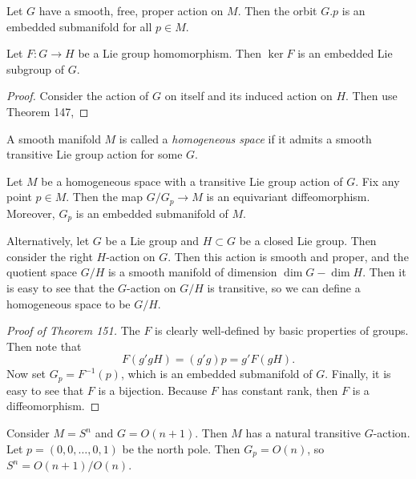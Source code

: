 \documentclass[twoside, 10pt]{article}
\begin{document}
    \begin{cor}
        Let $G$ have a smooth, free, proper action on $M$. Then the orbit $G.p$ is an embedded submanifold for all $p \in M$.
    \end{cor}

    \begin{prop}
        Let $F:G \to H$ be a Lie group homomorphism. Then $\ker F$ is an embedded Lie subgroup of $G$.
    \end{prop}

    \begin{proof}
        Consider the action of $G$ on itself and its induced action on $H$. Then use Theorem 147,
    \end{proof}

    \begin{defn}
        A smooth manifold $M$ is called a \textit{homogeneous space} if it admits a smooth transitive Lie group action for some $G$.
    \end{defn}

    \begin{thm}
        Let $M$ be a homogeneous space with a transitive Lie group action of $G$. Fix any point $p \in M$. Then the map $G/G_p \to M$ is an equivariant diffeomorphism. Moreover, $G_p$ is an embedded submanifold of $M$.
    \end{thm}

    Alternatively, let $G$ be a Lie group and $H \subset G$ be a closed Lie group. Then consider the right $H$-action on $G$. Then this action is smooth and proper, and the quotient space $G/H$ is a smooth manifold of dimension $\dim G - \dim H$. Then it is easy to see that the $G$-action on $G/H$ is transitive, so we can define a homogeneous space to be $G/H$.

    \begin{proof}[Proof of Theorem 151]
        The $F$ is clearly well-defined by basic properties of groups. Then note that
        \[ F(g'gH) = (g'g)p = g' F(gH).\]
        Now set $G_p = F^{-1}(p)$, which is an embedded submanifold of $G$. Finally, it is easy to see that $F$ is a bijection. Because $F$ has constant rank, then $F$ is a diffeomorphism.
    \end{proof}

    \begin{exm}
        Consider $M = S^n$ and $G = O(n+1)$. Then $M$ has a natural transitive $G$-action. Let $p = (0, 0, \ldots, 0, 1)$ be the north pole. Then $G_p = O(n)$, so $S^n = O(n+1)/O(n)$.
    \end{exm}
\end{document}
